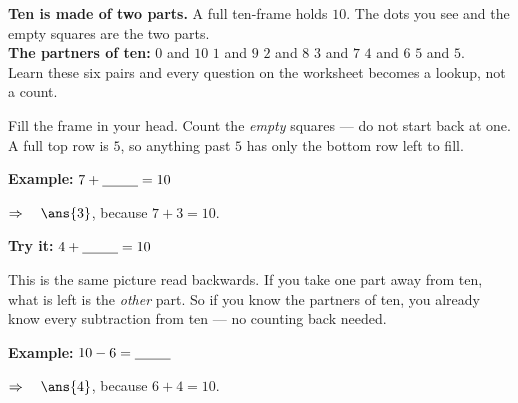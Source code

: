 \documentclass[12pt]{article}
\begin{document}

\begin{formulabox}
\textbf{Ten is made of two parts.} A full ten-frame holds $10$. The dots you
see and the empty squares are the two parts.\\[3pt]
\textbf{The partners of ten:} \quad $0$ and $10$ \quad $1$ and $9$ \quad
$2$ and $8$ \quad $3$ and $7$ \quad $4$ and $6$ \quad $5$ and $5$.\\[3pt]
Learn these six pairs and every question on the worksheet becomes a lookup, not
a count.
\end{formulabox}


\begin{formulabox}
Fill the frame in your head. Count the \emph{empty} squares --- do not start
back at one. A full top row is $5$, so anything past $5$ has only the bottom
row left to fill.
\end{formulabox}

\begin{examplebox}
\textbf{Example:} \quad $7 + \underline{\hspace{0.9cm}} = 10$

$\Rightarrow\quad \ans{3}$, because $7 + 3 = 10$.
\end{examplebox}

\begin{tryitbox}
\textbf{Try it:} \quad $4 + \underline{\hspace{0.9cm}} = 10$\\[2pt]
\end{tryitbox}


\begin{formulabox}
This is the same picture read backwards. If you take one part away from ten,
what is left is the \emph{other} part. So if you know the partners of ten, you
already know every subtraction from ten --- no counting back needed.
\end{formulabox}

\begin{examplebox}
\textbf{Example:} \quad $10 - 6 = \underline{\hspace{0.9cm}}$

$\Rightarrow\quad \ans{4}$, because $6 + 4 = 10$.
\end{examplebox}
\end{document}

